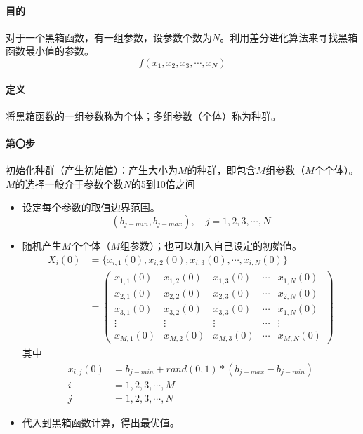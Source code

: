 \paragraph{目的} 对于一个黑箱函数，有一组参数，设参数个数为$N$。利用差分进化算法来寻找黑箱函数最小值的参数。
\begin{equation}
f(x_1,x_2,x_3,\cdots,x_N)
\end{equation}

\paragraph{定义} 将黑箱函数的一组参数称为个体；多组参数（个体）称为种群。
 
\paragraph{第〇步} 初始化种群（产生初始值）：产生大小为$M$的种群，即包含$M$组参数（$M$个个体）。$M$的选择一般介于参数个数$N$的5到10倍之间

\begin{itemize}
\item 设定每个参数的取值边界范围。
\begin{equation}
(b_{j-min},b_{j-max}),\quad j = 1, 2, 3, \cdots, N
\end{equation}
\item 随机产生$M$个个体（$M$组参数）；也可以加入自己设定的初始值。
\begin{align}
X_i(0) &= \{x_{i,1}(0),x_{i,2}(0),x_{i,3}(0),\cdots, x_{i,N}(0)\}\\
&=\begin{pmatrix}
x_{1,1}(0) & x_{1,2}(0) &x_{1,3}(0) &\cdots &x_{1,N}(0)\\
x_{2,1}(0) & x_{2,2}(0) &x_{2,3}(0) &\cdots &x_{2,N}(0)\\
x_{3,1}(0) & x_{3,2}(0) &x_{3,3}(0) &\cdots &x_{1,N}(0)\\
\vdots      &   \vdots     & \vdots      & \cdots & \vdots \\
x_{M,1}(0) & x_{M,2}(0) &x_{M,3}(0) &\cdots &x_{M,N}(0)
\end{pmatrix}
\end{align}
其中
\begin{align}
x_{i,j}(0) &= b_{j-min} + rand(0,1)* (b_{j-max}-b_{j-min})\\
 i &= 1,2,3,\cdots, M\\
 j &= 1,2,3,\cdots, N
\end{align}
\item 代入到黑箱函数计算，得出最优值。
\end{itemize}


